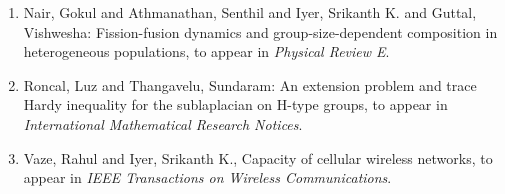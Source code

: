 \begin{enumerate}[resume, leftmargin=27pt]
	\item\label{iyer:heterogeneous-populations} Nair, Gokul and Athmanathan, Senthil and Iyer, Srikanth K. and Guttal, Vishwesha: Fission-fusion dynamics and group-size-dependent composition in heterogeneous populations,
	      to appear in {\em Physical Review E}.


	\item\label{thangavelu:H-type-groups} Roncal, Luz and Thangavelu, Sundaram: An extension problem and trace Hardy
	      inequality for the sublaplacian on H-type groups, to appear in {\em International Mathematical Research Notices}.

	\item\label{iyer:wireless-networks} Vaze, Rahul and Iyer, Srikanth K., Capacity of cellular wireless networks,
	      to appear in {\em IEEE Transactions on Wireless Communications}.

\end{enumerate}


\vspace{-2.5mm}

